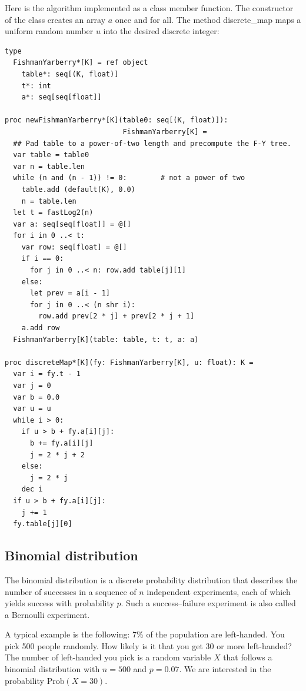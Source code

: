 \documentclass[justified, sixbynine]{tufte-book}
\theoremstyle{plain}%
\newtheorem * {corollary}{Corollary}
\theoremstyle{definition}
\theoremstyle{remark}
\newtheorem * {remark}{Remark}
\newtheorem * {note}{Note}
\begin{document}
\begin{fullwidth}
Here is the algorithm implemented as a class member function. The
constructor of the class creates an array $a$ once and for all. The method
discrete\_map maps a uniform random number $u$ into the desired discrete
integer:


\begin{lstlisting}
type
  FishmanYarberry*[K] = ref object
    table*: seq[(K, float)]
    t*: int
    a*: seq[seq[float]]

proc newFishmanYarberry*[K](table0: seq[(K, float)]):
                            FishmanYarberry[K] =
  ## Pad table to a power-of-two length and precompute the F-Y tree.
  var table = table0
  var n = table.len
  while (n and (n - 1)) != 0:        # not a power of two
    table.add (default(K), 0.0)
    n = table.len
  let t = fastLog2(n)
  var a: seq[seq[float]] = @[]
  for i in 0 ..< t:
    var row: seq[float] = @[]
    if i == 0:
      for j in 0 ..< n: row.add table[j][1]
    else:
      let prev = a[i - 1]
      for j in 0 ..< (n shr i):
        row.add prev[2 * j] + prev[2 * j + 1]
    a.add row
  FishmanYarberry[K](table: table, t: t, a: a)

proc discreteMap*[K](fy: FishmanYarberry[K], u: float): K =
  var i = fy.t - 1
  var j = 0
  var b = 0.0
  var u = u
  while i > 0:
    if u > b + fy.a[i][j]:
      b += fy.a[i][j]
      j = 2 * j + 2
    else:
      j = 2 * j
    dec i
  if u > b + fy.a[i][j]:
    j += 1
  fy.table[j][0]
\end{lstlisting}


\goodbreak\subsection{Binomial distribution}


The binomial distribution is a discrete probability distribution that
describes the number of successes in a sequence of $n$ independent
experiments, each of which yields success with probability $p$. Such a
success--failure experiment is also called a Bernoulli experiment.

A typical example is the following: 7\% of the population are left-handed.
You pick 500 people randomly. How likely is it that you get 30 or more
left-handed? The number of left-handed you pick is a random variable $X$
that follows a binomial distribution with $n=500$ and $p=0.07$. We are
interested in the probability $\textrm{Prob}(X=30)$.


\end{fullwidth}
\end{document}

